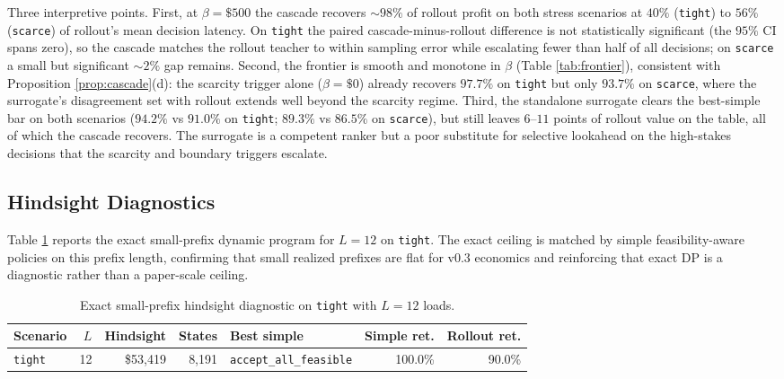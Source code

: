 \documentclass[11pt]{article}
\begin{document}
Three interpretive points. First, at $\beta = \$500$ the cascade recovers
$\sim 98\%$ of rollout profit on both stress scenarios at $40\%$
(\texttt{tight}) to $56\%$ (\texttt{scarce}) of rollout's mean decision
latency. On \texttt{tight} the paired cascade-minus-rollout difference is
not statistically significant (the $95\%$ CI spans zero), so the cascade
matches the rollout teacher to within sampling error while escalating
fewer than half of all decisions; on \texttt{scarce} a small but
significant $\sim 2\%$ gap remains. Second, the frontier is smooth and
monotone in $\beta$ (Table \ref{tab:frontier}), consistent with
Proposition \ref{prop:cascade}(d): the scarcity trigger alone
($\beta = \$0$) already recovers $97.7\%$ on \texttt{tight} but only
$93.7\%$ on \texttt{scarce}, where the surrogate's disagreement set with
rollout extends well beyond the scarcity regime. Third, the standalone
surrogate clears the best-simple bar on both scenarios ($94.2\%$ vs
$91.0\%$ on \texttt{tight}; $89.3\%$ vs $86.5\%$ on \texttt{scarce}), but
still leaves $6$--$11$ points of rollout value on the table, all of which
the cascade recovers. The surrogate is a competent ranker but a poor
substitute for selective lookahead on the high-stakes decisions that the
scarcity and boundary triggers escalate.

\subsection{Hindsight Diagnostics}

Table \ref{tab:exact} reports the exact small-prefix dynamic program for
$L = 12$ on \texttt{tight}. The exact ceiling is matched by simple
feasibility-aware policies on this prefix length, confirming that small
realized prefixes are flat for v0.3 economics and reinforcing that
exact DP is a diagnostic rather than a paper-scale ceiling.

\begin{table}[t]
\centering
\caption{Exact small-prefix hindsight diagnostic on \texttt{tight} with
$L = 12$ loads.}
\label{tab:exact}
\small
\begin{tabular}{lrrrlrr}
\toprule
Scenario & $L$ & Hindsight & States & Best simple & Simple ret. & Rollout ret. \\
\midrule
\texttt{tight} & 12 & \$53,419 & 8,191 & \texttt{accept\_all\_feasible} & 100.0\% & 90.0\% \\
\bottomrule
\end{tabular}
\end{table}
\end{document}
